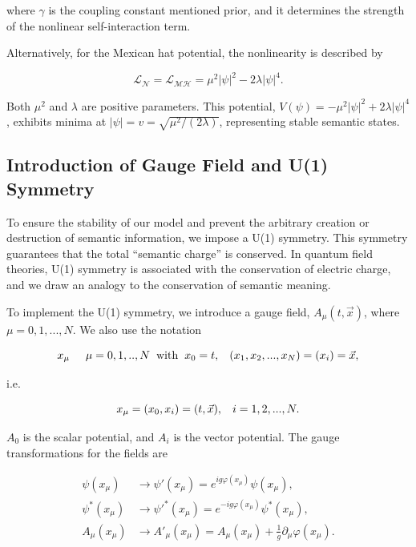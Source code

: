 \documentclass[prd,amsmath,amssymb,12pt]{revtex4}
\begin{document}
\noindent
where $\gamma$ is the coupling constant mentioned prior, and it determines the strength of the nonlinear
self-interaction term.

Alternatively, for the Mexican hat potential, the nonlinearity is described by

\begin{equation}
    \mathcal{L_{N}} = \mathcal{L_{MH}} =
     \mu^2 |\psi|^2 - 2\lambda |\psi|^4.
\end{equation}

\noindent
Both $\mu^2$ and $\lambda$ are positive parameters. This potential, $V(\psi) = - \mu^2 |\psi|^2 + 2\lambda |\psi|^4$,
exhibits minima at $|\psi| = v = \sqrt{\mu^2/(2\lambda)}$, representing stable semantic states.

\subsection{Introduction of Gauge Field and U(1) Symmetry}

To ensure the stability of our model and prevent the arbitrary creation or destruction of semantic information,
we impose a U(1) symmetry. This symmetry guarantees that the total ``semantic charge'' is conserved. In quantum field
theories, U(1) symmetry is associated with the conservation of electric charge, and we draw an analogy to the
conservation of semantic meaning.

To implement the U(1) symmetry, we introduce a gauge field, $A_{\mu}(t, \vec{x})$, where $\mu = 0, 1, ..., N$.
We also use the notation

\begin{equation}
  x_{\mu}\hspace*{0.5cm}\mu = 0,1,..,N \hspace*{0.2cm}{\rm with}
  \hspace*{0.2cm}x_0=t,\hspace*{0.3cm}(x_1,x_2,...,x_{N})=(x_i) = \vec{x},
\end{equation}

\noindent
i.e.

\begin{equation}
  x_{\mu} = (x_0,x_i) = (t,\vec{x}), \hspace*{0.3cm}i=1,2,...,N.
\end{equation}

\noindent
$A_0$ is the scalar potential, and $A_i$ is the vector potential.
The gauge transformations for the fields are

\begin{align}
  \psi(x_{\mu}) &\rightarrow \psi'(x_{\mu}) = e^{ig\varphi(x_{\mu})} \psi(x_{\mu}), \phantom{\frac{1}[1]}\\
  \psi^*(x_{\mu}) &\rightarrow \psi'^*(x_{\mu}) = e^{-ig\varphi(x_{\mu})} \psi^*(x_{\mu}), \phantom{\frac{1}[1]}\\
  A_{\mu}(x_{\mu}) &\rightarrow A'_{\mu}(x_{\mu}) = A_{\mu}(x_{\mu}) + \frac{1}{g}\partial_{\mu}\varphi(x_{\mu}).
\end{align}
\end{document}
